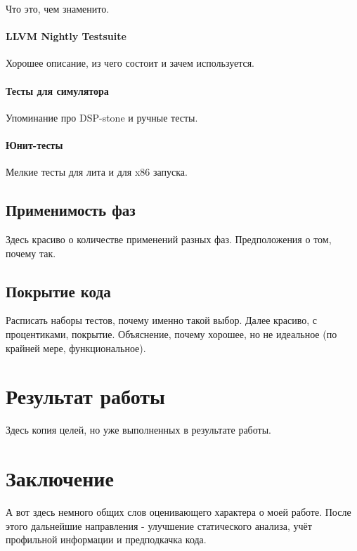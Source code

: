 \documentclass[12pt,a4paper]{article}
\begin{document}
Что это, чем знаменито.

\paragraph{LLVM Nightly Testsuite}

Хорошее описание, из чего состоит и зачем используется.

\paragraph{Тесты для симулятора}

Упоминание про DSP-stone и ручные тесты.

\paragraph{Юнит-тесты}

Мелкие тесты для лита и для x86 запуска.

\subsection{Применимость фаз}

Здесь красиво о количестве применений разных фаз. Предположения о том, почему так.

\subsection{Покрытие кода}

Расписать наборы тестов, почему именно такой выбор. Далее красиво, с процентиками, покрытие. Объяснение, почему хорошее, но не идеальное (по крайней мере, функциональное).

\section{Результат работы}

Здесь копия целей, но уже выполненных в результате работы.

\section{Заключение}

А вот здесь немного общих слов оценивающего характера о моей работе. После этого дальнейшие направления - улучшение статического анализа, учёт профильной информации и предподкачка кода.

{}

\end{document}
